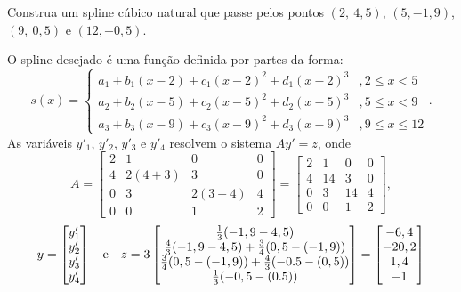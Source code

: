 \begin{ex}Construa um spline cúbico natural que passe pelos pontos $(2,~4,5)$, $(5,-1,9)$, $(9,~0,5)$ e $(12,-0,5)$.
\end{ex}
\begin{sol}
O spline desejado é uma função definida por partes da forma:
\begin{equation}
s(x)=\left\{\begin{array}{ll}
    a_1+b_1(x-2)+c_1(x-2)^2+d_1(x-2)^3 &, 2\leq x <5\\
    a_2+b_2(x-5)+c_2(x-5)^2+d_2(x-5)^3 &, 5\leq x <9\\
    a_3+b_3(x-9)+c_3(x-9)^2+d_3(x-9)^3 &, 9\leq x \leq 12
\end{array}\right..  
\end{equation}
As variáveis $y'_1$, $y'_2$, $y'_3$ e $y'_4$ resolvem o sistema $Ay' = z$, onde
\begin{equation*}
A = \begin{bmatrix}
  2 &1&0&0 \\
  4&2(4+3)&3&0\\
  0&3&2(3+4)&4\\
  0&0&1&2
\end{bmatrix} = \begin{bmatrix}
  2 &1&0&0 \\
  4&14&3&0\\
  0&3&14&4\\
  0&0&1&2
\end{bmatrix}  ,
\end{equation*}
\begin{equation*}
y = \begin{bmatrix}
y'_1\\
y'_2\\
y'_3\\
y'_4
\end{bmatrix} \quad \hbox{e}\quad
z = 3\begin{bmatrix}
\frac{1}{3}(-1,9-4,5)\\
\frac{4}{3}(-1,9-4,5)+\frac{3}{4}(0,5-(-1,9))\\
\frac{3}{4}(0,5-(-1,9))+\frac{4}{3}(-0.5-(0,5))\\
\frac{1}{3}(-0,5-(0.5))
\end{bmatrix} = \begin{bmatrix}
-6,4\\
-20,2\\
1,4\\
-1
\end{bmatrix}  
\end{equation*}

\end{sol}
